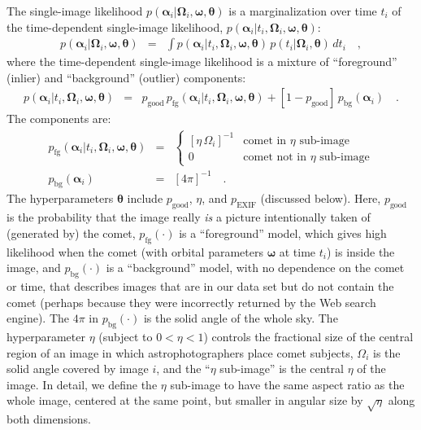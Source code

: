 \documentclass[12pt,preprint]{aastex}
\newcommand{\paramvector}[1]{\boldsymbol{#1}}
\newcommand{\pointing}{\paramvector{\alpha}}
\newcommand{\fovpars}{\paramvector{\Omega}}
\newcommand{\orbitpars}{\paramvector{\omega}}
\newcommand{\hyperpars}{\paramvector{\theta}}
\newcommand{\pgood}{p_\mathrm{good}}
\newcommand{\exif}{\mathrm{EXIF}}
\newcommand{\pexif}{p_\exif}
\newcommand{\pfg}{p_\mathrm{fg}}
\newcommand{\pbg}{p_\mathrm{bg}}
\begin{document}
The single-image likelihood
$p(\pointing_i|\fovpars_i,\orbitpars,\hyperpars)$ is a marginalization
over time $t_i$ of the time-dependent single-image likelihood,
$p(\pointing_i|t_i,\fovpars_i,\orbitpars,\hyperpars)$:
\begin{eqnarray}\displaystyle
p(\pointing_i|\fovpars_i,\orbitpars,\hyperpars) &=& \int
p(\pointing_i|t_i,\fovpars_i,\orbitpars,\hyperpars)
\,p(t_i|\fovpars_i,\hyperpars)\,dt_i \quad , %
\end{eqnarray}
where the time-dependent single-image likelihood is a mixture of
``foreground'' (inlier) and ``background'' (outlier) components:
\begin{eqnarray}\displaystyle
p(\pointing_i|t_i,\fovpars_i,\orbitpars,\hyperpars)
  &=& \pgood\,\pfg(\pointing_i|t_i,\fovpars_i,\orbitpars,\hyperpars)
    + [1-\pgood]\,\pbg(\pointing_i) \quad .
\end{eqnarray}
The components are:
\begin{eqnarray}\displaystyle
\pfg(\pointing_i|t_i,\fovpars_i,\orbitpars,\hyperpars)
  &=& \left\{\begin{array}{ll}
      [\eta\,\Omega_i]^{-1} & \mbox{comet in $\eta$ sub-image} \\
                          0 & \mbox{comet not in $\eta$ sub-image}
    \end{array}\right.
\\
\pbg(\pointing_i)
  &=& [4\pi]^{-1}
\quad .
\end{eqnarray}
The hyperparameters $\hyperpars$ include $\pgood$, $\eta$, and
$\pexif$ (discussed below).  Here, $\pgood$ is the probability that
the image really \emph{is} a picture intentionally taken of (generated
by) the comet, $\pfg(\cdot)$ is a ``foreground'' model, which gives
high likelihood when the comet (with orbital parameters $\orbitpars$
at time $t_i$) is inside the image, and $\pbg(\cdot)$ is a
``background'' model, with no dependence on the comet or time, that
describes images that are in our data set but do not contain the comet
(perhaps because they were incorrectly returned by the Web search
engine).  The $4\pi$ in $\pbg(\cdot)$ is the solid angle of the whole
sky.  The hyperparameter $\eta$ (subject to $0<\eta<1$) controls the
fractional size of the central region of an image in which
astrophotographers place comet subjects, $\Omega_i$ is the solid angle
covered by image $i$, and the ``$\eta$ sub-image'' is the central
$\eta$ of the image.  In detail, we define the $\eta$ sub-image to
have the same aspect ratio as the whole image, centered at the same
point, but smaller in angular size by $\sqrt{\eta}$ along both
dimensions.
\end{document}
